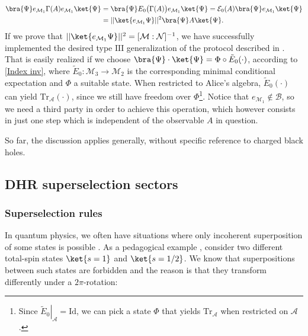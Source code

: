 \documentclass[a4paper,11pt]{article}
\begin{document}
\begin{equation}
    \begin{split}
        \bra{\Psi} e_{\mathcal{M}_1} \Gamma (A) e_{\mathcal{M}_1} \ket{\Psi} &= \bra{\Psi} E_0 \big( \Gamma (A) \big) e_{\mathcal{M}_1} \ket{\Psi} = \mathcal{E}_0 (A) \bra{\Psi} e_{\mathcal{M}_1} \ket{\Psi} \\
        &= ||\ket{e_{\mathcal{M}_1} \Psi}||^2 \bra{\Psi} A \ket{\Psi} \text{.}
    \end{split}
    \label{teleport final}
\end{equation}
%
If we prove that $||\ket{e_{\mathcal{M}_1} \Psi}||^2 = [\mathcal{M}:\mathcal{N}]^{-1}$, we have successfully implemented the desired type $\mathrm{III}$ generalization of the protocol described in \cite{Verlinde}. That is easily realized if we choose $\bra{\Psi} \cdot \ket{\Psi} = \Phi \circ \tilde{E}_0(\cdot)$, according to \ref{Index inv}, where $\tilde{E}_0: \mathcal{M}_3 \rightarrow \mathcal{M}_2$ is the corresponding minimal conditional expectation and $\Phi$ a suitable state. When restricted to Alice's algebra, $\tilde{E}_0(\cdot)$ can yield $\mathrm{Tr}_{\mathcal{A}}(\cdot)$, since we still have freedom over $\Phi$\footnote{Since $\left. \tilde{E}_0 \right|_{\mathcal{A}} = \mathrm{Id}$, we can pick a state $\Phi$ that yields $\mathrm{Tr}_{\mathcal{A}}$ when restricted on $\mathcal{A}$.}. Notice that $e_{\mathcal{M}_1} \not\in \mathcal{B}$, so we need a third party in order to achieve this operation, which however consists in just one step which is independent of the observable $A$ in question.

So far, the discussion applies generally, without specific reference to charged black holes.

\subsection{DHR superselection sectors}

\subsubsection{Superselection rules}

In quantum physics, we often have situations where only incoherent superposition of some states is possible \cite{Superselection}. As a pedagogical example \cite{Giulini}, consider two different total-spin states $\ket{s=1}$ and $\ket{s=1/2}$. We know that superpositions between such states are forbidden and the reason is that they transform differently under a $2 \pi$-rotation:
\end{document}
